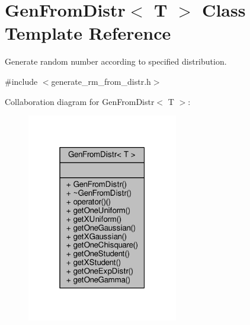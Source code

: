 \hypertarget{classGenFromDistr}{}\section{Gen\+From\+Distr$<$ T $>$ Class Template Reference}
\label{classGenFromDistr}


Generate random number according to specified distribution.  




{\ttfamily \#include $<$generate\+\_\+rm\+\_\+from\+\_\+distr.\+h$>$}



Collaboration diagram for Gen\+From\+Distr$<$ T $>$\+:
\nopagebreak
\begin{figure}[H]
\begin{center}
\leavevmode
\includegraphics[width=187pt]{classGenFromDistr__coll__graph}
\end{center}
\end{figure}
